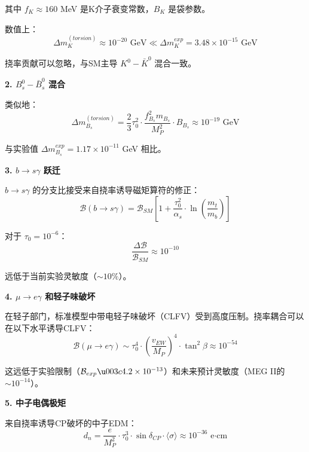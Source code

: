 其中 $f_K \approx 160$ MeV 是K介子衰变常数，$B_K$ 是袋参数。

数值上：
\begin{equation}
    \Delta m_K^{(torsion)} \approx 10^{-20} \text{ GeV} \ll \Delta m_K^{exp} = 3.48 \times 10^{-15} \text{ GeV}
\end{equation}

挠率贡献可以忽略，与SM主导 $K^0 - \bar{K}^0$ 混合一致。

\textbf{2. $B_s^0 - \bar{B}_s^0$ 混合}

类似地：
\begin{equation}
    \Delta m_{B_s}^{(torsion)} = \frac{2}{3} \tau_0^2 \cdot \frac{f_{B_s}^2 m_{B_s}}{M_P^2} \cdot B_{B_s} \approx 10^{-19} \text{ GeV}
\end{equation}

与实验值 $\Delta m_{B_s}^{exp} = 1.17 \times 10^{-11}$ GeV 相比。

\textbf{3. $b \to s \gamma$ 跃迁}

$b \to s \gamma$ 的分支比接受来自挠率诱导磁矩算符的修正：
\begin{equation}
    \mathcal{B}(b \to s \gamma) = \mathcal{B}_{SM} \left[1 + \frac{\tau_0^2}{\alpha_s} \cdot \ln\left(\frac{m_t}{m_b}\right)\right]
\end{equation}

对于 $\tau_0 = 10^{-6}$：
\begin{equation}
    \frac{\Delta \mathcal{B}}{\mathcal{B}_{SM}} \approx 10^{-10}
\end{equation}

远低于当前实验灵敏度（$\sim 10\%$）。

\textbf{4. $\mu \to e \gamma$ 和轻子味破坏}

在轻子部门，标准模型中带电轻子味破坏（CLFV）受到高度压制。挠率耦合可以在以下水平诱导CLFV：
\begin{equation}
    \mathcal{B}(\mu \to e \gamma) \sim \tau_0^4 \cdot \left(\frac{v_{EW}}{M_P}\right)^4 \cdot \tan^2\beta \approx 10^{-54}
\end{equation}

这远低于实验限制（$\mathcal{B}_{exp} \u003c 4.2 \times 10^{-13}$）和未来预计灵敏度（MEG II的 $\sim 10^{-14}$）。

\textbf{5. 中子电偶极矩}

来自挠率诱导CP破坏的中子EDM：
\begin{equation}
    d_n = \frac{e}{M_P^2} \cdot \tau_0^3 \cdot \sin\delta_{CP} \cdot \langle \sigma \rangle \approx 10^{-36} \text{ e·cm}
\end{equation}

